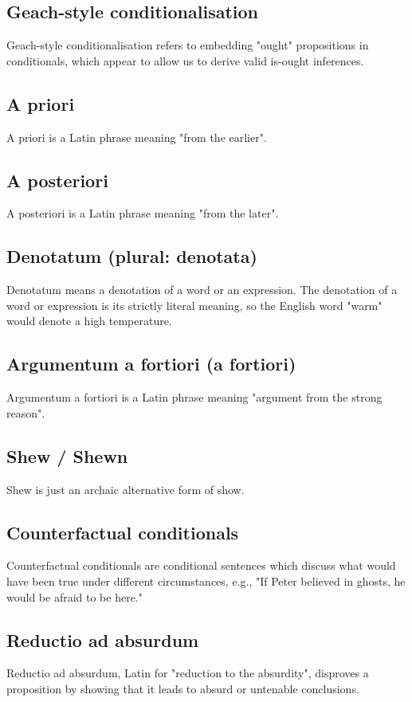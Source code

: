 \documentclass[11pt]{article}
\begin{document}
\subsection{Geach-style conditionalisation}
\label{sec:org1859d3b}
Geach-style conditionalisation refers to embedding "ought" propositions in conditionals, which appear to allow us to derive valid is-ought inferences.
\subsection{A priori}
\label{sec:org4c2188e}
A priori is a Latin phrase meaning "from the earlier".
\subsection{A posteriori}
\label{sec:orge46f4dc}
A posteriori is a Latin phrase meaning "from the later".
\subsection{Denotatum (plural: denotata)}
\label{sec:orgb04cd29}
Denotatum means a denotation of a word or an expression. The denotation of a word or expression is its strictly literal meaning, so the English word "warm" would denote a high temperature.
\subsection{Argumentum a fortiori (a fortiori)}
\label{sec:org532bd1e}
Argumentum a fortiori is a Latin phrase meaning "argument from the strong reason".
\subsection{Shew / Shewn}
\label{sec:org7db2174}
Shew is just an archaic alternative form of show.
\subsection{Counterfactual conditionals}
\label{sec:org312ddfe}
Counterfactual conditionals are conditional sentences which discuss what would have been true under different circumstances, e.g., "If Peter believed in ghosts, he would be afraid to be here."
\subsection{Reductio ad absurdum}
\label{sec:orgcfb041e}
Reductio ad absurdum, Latin for "reduction to the absurdity", disproves a proposition by showing that it leads to absurd or untenable conclusions.
\end{document}
